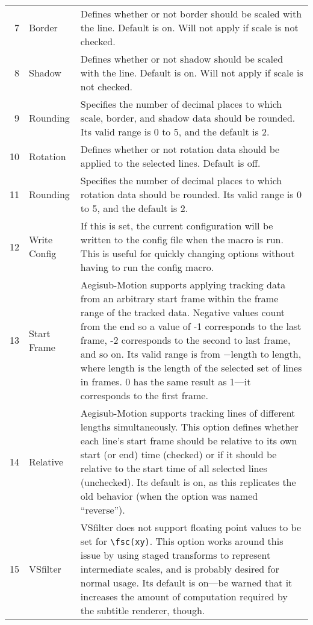 ﻿\documentclass[a4paper,12pt]{article}
\begin{document}
\begin{center}
\begin{longtable}{rlp{11cm}}
      7 & Border & Defines whether or not border should be scaled with the line. Default is on. Will not apply if scale is not checked. \\
      8 & Shadow & Defines whether or not shadow should be scaled with the line. Default is on. Will not apply if scale is not checked. \\
      9 & Rounding & Specifies the number of decimal places to which scale, border, and shadow data should be rounded. Its valid range is 0 to 5, and the default is 2. \\
      10 & Rotation & Defines whether or not rotation data should be applied to the selected lines. Default is off. \\
      11 & Rounding & Specifies the number of decimal places to which rotation data should be rounded. Its valid range is 0 to 5, and the default is 2. \\
      12 & Write Config & If this is set, the current configuration will be written to the config file when the macro is run. This is useful for quickly changing options without having to run the config macro.\\
      13 & Start Frame & Aegisub-Motion supports applying tracking data from an arbitrary start frame within the frame range of the tracked data. Negative values count from the end so a value of -1 corresponds to the last frame, -2 corresponds to the second to last frame, and so on. Its valid range is from $-\mathrm{length}$ to $\mathrm{length}$, where $\mathrm{length}$ is the length of the selected set of lines in frames. 0 has the same result as 1---it corresponds to the first frame.\\
      14 & Relative & Aegisub-Motion supports tracking lines of different lengths simultaneously. This option defines whether each line's start frame should be relative to its own start (or end) time (checked) or if it should be relative to the start time of all selected lines (unchecked). Its default is on, as this replicates the old behavior (when the option was named ``reverse''). \\
      15 & VSfilter & VSfilter does not support floating point values to be set for {\tt\textbackslash{}fsc(xy)}. This option works around this issue by using staged transforms to represent intermediate scales, and is probably desired for normal usage. Its default is on---be warned that it increases the amount of computation required by the subtitle renderer, though.
    \end{longtable}
  \end{center}
\end{document}
